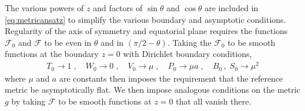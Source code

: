 \documentclass[12pt]{article}
\numberwithin{equation}{section}
\begin{document}
The various powers of $z$ and factors of $\sin\theta$ and $\cos\theta$ are included in \eqref{eq:metricansatz} to simplify the various boundary and asymptotic conditions. Regularity of the axis of symmetry and equatorial plane requires the functions $\mathcal{F}_0$ and $\mathcal{F}$ to be even in $\theta$ and in $( \pi/2 - \theta)$. Taking the $\mathcal{F}_0$ to be smooth functions at the boundary $z=0$ with Dirichlet boundary conditions,
\begin{eqnarray}
T_0 \to 1 \; , \quad
W_0 \to 0  \; , \quad
V_0 \to \mu  \; , \quad
P_0 \to \mu a  \; , \quad
B_0 \, , \; S_0 \to \mu^2  
\end{eqnarray}
where $\mu$ and $a$ are constants then imposes the requirement that the reference metric 
be asymptotically flat. 
We then impose analogous conditions on the metric $g$ by taking $\mathcal{F}$ to be smooth functions at $z = 0$ that all vanish there. 
\end{document}
